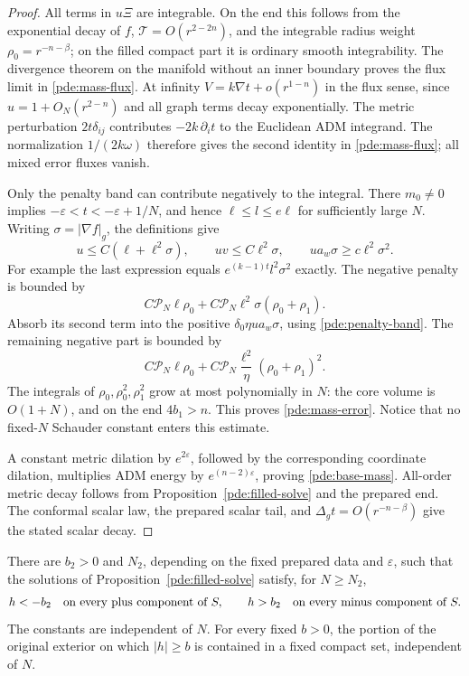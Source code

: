 \begin{proof}
All terms in \(u\Xi\) are integrable.  On the end this follows from
the exponential decay of \(f\),
\(\mathcal T=O(r^{2-2n})\), and the integrable radius weight
\(\rho_0=r^{-n-\beta}\); on the filled compact part it is ordinary
smooth integrability.  The divergence theorem on the manifold without
an inner boundary proves the flux limit in \eqref{pde:mass-flux}.
At infinity \(V=k\nabla t+o(r^{1-n})\) in the flux sense, since
\(u=1+O_N(r^{2-n})\) and all graph terms decay exponentially.
The metric perturbation \(2t\delta_{ij}\) contributes
\(-2k\,\partial_i t\) to the Euclidean ADM integrand.
The normalization \(1/(2k\omega)\) therefore gives the second
identity in \eqref{pde:mass-flux}; all mixed error fluxes vanish.

Only the penalty band can contribute negatively to the integral.
There \(m_0\ne0\) implies
\(-\varepsilon<t<-\varepsilon+1/N\), and hence
\(\ell\le l\le e\ell\) for sufficiently large \(N\).
Writing \(\sigma=|\nabla f|_g\), the definitions give
\begin{equation}
 u\le C(\ell+\ell^2\sigma),\qquad
 uv\le C\ell^2\sigma,\qquad
 ua_w\sigma\ge c\ell^2\sigma^2.
 \label{pde:penalty-band}
\end{equation}
For example the last expression equals
\(e^{(k-1)t}l^2\sigma^2\) exactly.
The negative penalty is bounded by
\[
 C\mathcal P_N\ell\rho_0
 +C\mathcal P_N\ell^2\sigma(\rho_0+\rho_1).
\]
Absorb its second term into the positive
\(\delta_0\eta ua_w\sigma\), using
\eqref{pde:penalty-band}.  The remaining negative part is bounded by
\[
 C\mathcal P_N\ell\rho_0
 +C\mathcal P_N\frac{\ell^2}{\eta}(\rho_0+\rho_1)^2.
\]
The integrals of \(\rho_0,\rho_0^2,\rho_1^2\) grow at most
polynomially in \(N\): the core volume is \(O(1+N)\), and on the end
\(4b_1>n\).  This proves \eqref{pde:mass-error}.  Notice that no
fixed-\(N\) Schauder constant enters this estimate.

A constant metric dilation by \(e^{2\varepsilon}\), followed by the
corresponding coordinate dilation, multiplies ADM energy by
\(e^{(n-2)\varepsilon}\), proving \eqref{pde:base-mass}.
All-order metric decay follows from
Proposition~\ref{pde:filled-solve} and the prepared end.
The conformal scalar law, the prepared scalar tail, and
\(\Delta_gt=O(r^{-n-\beta})\) give the stated scalar decay.
\end{proof}

\begin{proposition}
\label{pde:height-separation}
There are \(b_2>0\) and \(N_2\), depending on the fixed prepared data
and \(\varepsilon\), such that the solutions of
Proposition~\ref{pde:filled-solve} satisfy, for \(N\ge N_2\),
\[
 h<-b_2\quad\hbox{on every plus component of }S,\qquad
 h>b_2\quad\hbox{on every minus component of }S.
\]
The constants are independent of \(N\).
For every fixed \(b>0\), the portion of the original exterior on which
\(|h|\ge b\) is contained in a fixed compact set, independent of \(N\).
\end{proposition}

